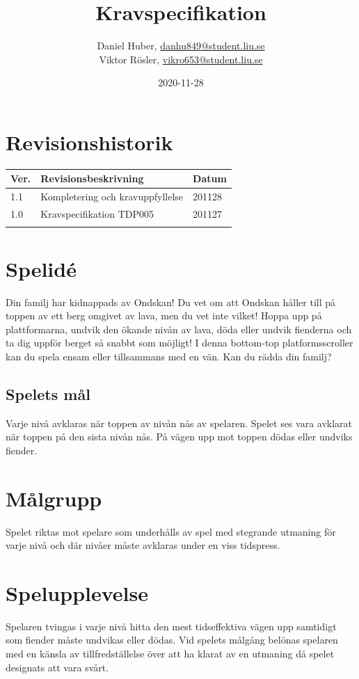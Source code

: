 \documentclass{TDP005mall}
\author{Daniel Huber, \url{danhu849@student.liu.se}\\
  Viktor Rösler, \url{vikro653@student.liu.se}}
\title{Kravspecifikation}
\date{2020-11-28}
\begin{document}
\projectpage
\tableofcontents
\newpage
\section{Revisionshistorik}
\begin{table}[!h]
\begin{tabularx}{\linewidth}{|l|X|l|}
\hline
  Ver. & Revisionsbeskrivning & Datum \\\hline
    1.1 & Kompletering och kravuppfyllelse & 201128 \\\hline
1.0 & Kravspecifikation TDP005 & 201127 \\\hline
\\\hline
\end{tabularx}
\end{table}


\section{Spelid\'{e} }
Din familj har kidnappads av Ondskan! Du vet om att Ondskan håller till på toppen av ett berg omgivet av lava, men du vet inte vilket! Hoppa upp på plattformarna, undvik den ökande nivån av lava, döda eller undvik fienderna och ta dig uppför berget så snabbt som möjligt! I denna bottom-top platformsscroller kan du spela ensam eller tillsammans med en vän. Kan du rädda din familj? 

\subsection{Spelets mål}
Varje nivå avklaras när toppen av nivån nås av spelaren. Spelet ses vara avklarat när toppen på den sista nivån nås. På vägen upp mot toppen dödas eller undviks fiender. 

\section{Målgrupp}%
Spelet riktas mot spelare som underhålls av spel med stegrande utmaning för varje nivå och där nivåer måste avklaras under en viss tidspress. 

\section{Spelupplevelse}%
Spelaren tvingas i varje nivå hitta den mest tidseffektiva vägen upp samtidigt som fiender måste undvikas eller dödas. Vid spelets målgång belönas spelaren med en känsla av tillfredställelse över att ha klarat av en utmaning då spelet designats att vara svårt.
\end{document}
